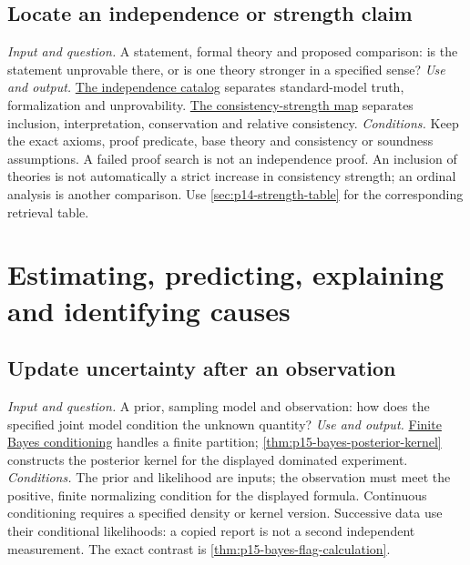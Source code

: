 \subsection{Locate an independence or strength claim}
\label{sec:p14-finder-strength}
\textit{Input and question.} A statement, formal theory and proposed
comparison: is the statement unprovable there, or is one theory stronger in
a specified sense?
\textit{Use and output.}
\hyperref[sec:p05-independence-catalog]{The independence catalog} separates
standard-model truth, formalization and unprovability.
\hyperref[sec:p06-consistency-strength]{The consistency-strength map}
separates inclusion, interpretation, conservation and relative consistency.
\textit{Conditions.} Keep the exact axioms, proof predicate, base theory and
consistency or soundness assumptions. A failed proof search is not an
independence proof. An inclusion of theories is not automatically a strict
increase in consistency strength; an ordinal analysis is another comparison.
Use \cref{sec:p14-strength-table} for the corresponding retrieval table.

\section{Estimating, predicting, explaining and identifying causes}
\label{sec:p14-finder-evidence}

\subsection{Update uncertainty after an observation}
\label{sec:p14-finder-update}
\textit{Input and question.} A prior, sampling model and observation: how
does the specified joint model condition the unknown quantity?
\textit{Use and output.}
\hyperref[thm:p15-finite-bayes]{Finite Bayes conditioning} handles a finite
partition; \cref{thm:p15-bayes-posterior-kernel} constructs the posterior kernel
for the displayed dominated experiment.
\textit{Conditions.} The prior and likelihood are inputs; the observation
must meet the positive, finite normalizing condition for the displayed
formula. Continuous conditioning requires a specified density or kernel
version. Successive data use their conditional likelihoods: a copied report
is not a second independent measurement. The exact contrast is
\cref{thm:p15-bayes-flag-calculation}.

